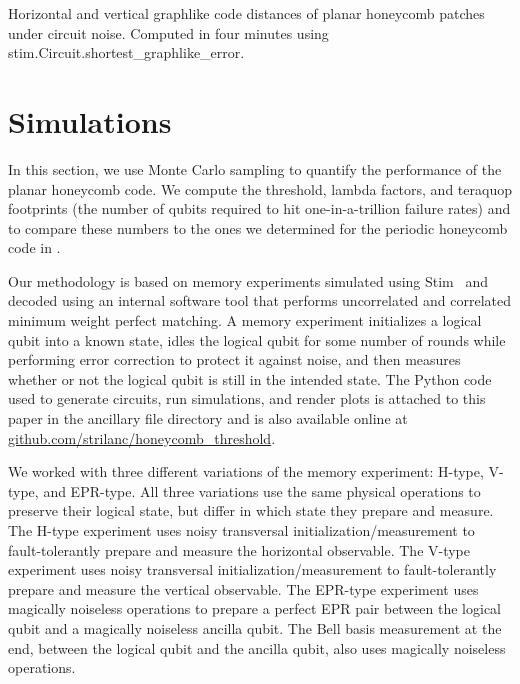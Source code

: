 \documentclass[onecolumn,unpublished,a4paper]{quantumarticle}
\theoremstyle{definition}
\theoremstyle{definition}
\theoremstyle{definition}
\begin{document}
\begin{table}[ht!]
    \centering
    \resizebox{\linewidth}{!}{
    
    }
    \caption{
    Horizontal and vertical graphlike code distances of planar honeycomb patches under circuit noise.
    Computed in four minutes using stim.Circuit.shortest\_graphlike\_error.
    }
    \label{tbl:graphlike_distances}
\end{table}

\section{Simulations}
\label{sec:sims}

In this section, we use Monte Carlo sampling to quantify the performance of the planar honeycomb code.
We compute the threshold, lambda factors, and teraquop footprints (the number of qubits required to hit one-in-a-trillion failure rates) and to compare these numbers to the ones we determined for the periodic honeycomb code in \cite{gidney2021honeycombmemory}.

Our methodology is based on memory experiments simulated using Stim~\cite{gidney2021stim} and decoded using an internal software tool that performs uncorrelated and correlated minimum weight perfect matching.
A memory experiment initializes a logical qubit into a known state, idles the logical qubit for some number of rounds while performing error correction to protect it against noise, and then measures whether or not the logical qubit is still in the intended state.
The Python code used to generate circuits, run simulations, and render plots is attached to this paper in the ancillary file directory  and is also available online at \href{https://github.com/strilanc/honeycomb_threshold}{github.com/strilanc/honeycomb\_threshold}.

We worked with three different variations of the memory experiment: H-type, V-type, and EPR-type.
All three variations use the same physical operations to preserve their logical state, but differ in which state they prepare and measure.
The H-type experiment uses noisy transversal initialization/measurement to fault-tolerantly prepare and measure the horizontal observable.
The V-type experiment uses noisy transversal initialization/measurement to fault-tolerantly prepare and measure the vertical observable.
The EPR-type experiment uses magically noiseless operations to prepare a perfect EPR pair between the logical qubit and a magically noiseless ancilla qubit.
The Bell basis measurement at the end, between the logical qubit and the ancilla qubit, also uses magically noiseless operations.
\end{document}

